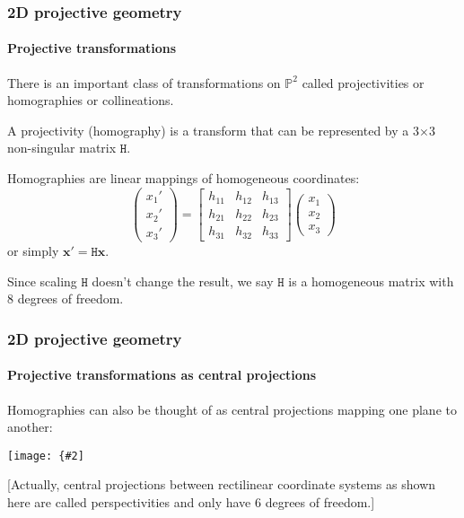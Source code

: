 \documentclass[aspectratio=169]{beamer}
\renewcommand{\vec}[1]{\boldsymbol{#1}}
\newcommand{\mat}[1]{\mathtt{#1}}
\def\Pset{\mathbb{P}}
\newcommand{\myfig}[3]{\centerline{\texttt{[image: \{\#2]}}}
    \centerline{\scriptsize #3}}
\begin{document}
\begin{frame}
\frametitle{2D projective geometry}
\framesubtitle{Projective transformations}

There is an important class of transformations on $\Pset^2$ called
\alert{projectivities} or \alert{homographies} or
\alert{collineations}.

\medskip

A projectivity (homography) is a transform that can be represented by
a 3$\times$3 non-singular matrix $\mat{H}$.

\medskip

Homographies are \alert{linear mappings} of homogeneous coordinates:
\begin{equation*}
\begin{pmatrix}
x_1' \\ x_2' \\ x_3'
\end{pmatrix} =
\begin{bmatrix}
h_{11} & h_{12} & h_{13} \\
h_{21} & h_{22} & h_{23} \\
h_{31} & h_{32} & h_{33}
\end{bmatrix}
\begin{pmatrix}
x_1 \\ x_2 \\ x_3
\end{pmatrix}
\end{equation*}
or simply $\vec{x}' = \mat{H}\vec{x}$.

\medskip

Since scaling $\mat{H}$ doesn't change the result, we say $\mat{H}$ is
a \alert{homogeneous matrix} with 8 degrees of freedom.

\end{frame}

\begin{frame}
\frametitle{2D projective geometry}
\framesubtitle{Projective transformations as central projections}

Homographies can also be thought of as \alert{central projections}
mapping one plane to another:

\myfig{3in}{HZ-fig1-3}{Hartley and Zisserman (2004), Fig.\ 2.3}

\medskip

[Actually, central projections between rectilinear coordinate systems
as shown here are called \alert{perspectivities} and only have 6
degrees of freedom.]

\end{frame}
\end{document}
